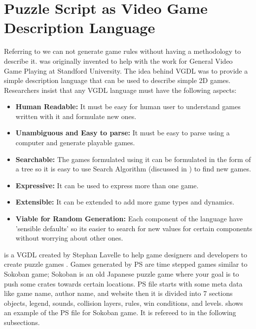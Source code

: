 \section{Puzzle Script as Video Game Description Language}
Referring to  we can not generate game rules without having a methodology to describe it.  was originally invented to help with the work for General Video Game Playing at Standford University. The idea behind VGDL was to provide a simple description language that can be used to describe simple 2D games. Researchers insist that any VGDL language must have the following aspects:\cite{vgdl}
\begin{itemize}\itemsep0pt \parskip0pt 
	\item \textbf{Human Readable:} It must be easy for human user to understand games written with it and formulate new ones.
	\item \textbf{Unambiguous and Easy to parse:} It must be easy to parse using a computer and generate playable games.
	\item \textbf{Searchable:} The games formulated using it can be formulated in the form of a tree so it is easy to use Search Algorithm (discussed in ) to find new games.
	\item \textbf{Expressive:} It can be used to express more than one game.
	\item \textbf{Extensible:} It can be extended to add more game types and dynamics.
	\item \textbf{Viable for Random Generation:} Each component of the language have 'sensible defaults' so its easier to search for new values for certain components without worrying about other ones.
\end{itemize}

\newpage
{}

 is a VGDL created by Stephan Lavelle to help game designers and developers to create puzzle games \cite{puzzleScript}. Games generated by PS are time stepped games similar to Sokoban game; Sokoban is an old Japanese puzzle game where your goal is to push some crates towards certain locations\cite{sokoban}. PS file starts with some meta data like game name, author name, and website then it is divided into 7 sections objects, legend, sounds, collision layers, rules, win conditions, and levels.  shows an example of the PS file for Sokoban game. It is refereed to in the following subsections.

